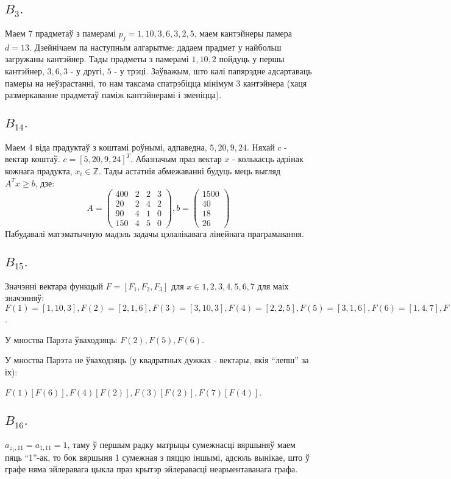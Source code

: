 \documentclass{article}
\begin{document}
\subsection*{$B_{3}.$}
Маем 7 прадметаў з памерамі $p_j = 1, 10, 3, 6, 3, 2, 5$, маем кантэйнеры памера $d = 13$.
Дзейнічаем па наступным алгарытме: дадаем прадмет у найбольш загружаны кантэйнер. Тады прадметы
з памерамі $1, 10, 2$ пойдуць у першы кантэйнер, $3, 6, 3$ - у другі, $5$ - у трэці.
Заўважым, што калі папярэдне адсартаваць памеры на неўзрастанні, то нам таксама спатрэбіцца мінімум
3 кантэйнера (хаця размеркаванне прадметаў паміж кантэйнерамі і зменіцца).

\subsection*{$B_{14}.$}
Маем 4 віда прадуктаў з коштамі роўнымі, адпаведна, $5, 20, 9, 24$. Няхай $c$ - вектар коштаў.
$c = [5, 20, 9, 24]^T$. Абазначым праз вектар $x$ - колькасць адзінак кожнага прадукта, $x_i \in \mathbb{Z}$.
Тады астатнія абмежаванні будуць мець выгляд $A^Tx \geq b$, дзе:
\[
A =
 \begin{pmatrix}
  400 & 2 & 2 & 3 \\
  20 & 2 & 4 & 2 \\
  90 & 4 & 1 & 0 \\
  150 & 4 & 5 & 0
 \end{pmatrix},
b =
 \begin{pmatrix}
  1500 \\
  40 \\
  18 \\
  26
 \end{pmatrix}
\]
Пабудавалі матэматычную мадэль задачы цэлалікавага лінейнага праграмавання.

\subsection*{$B_{15}.$}
Значэнні вектара функцый $F = [F_1, F_2, F_3]$ для $x \in {1, 2, 3, 4, 5, 6, 7}$ для маіх значэнняў:
$F(1) = [1, 10, 3], F(2) = [2, 1, 6], F(3) = [3, 10, 3], F(4) = [2, 2, 5], F(5) = [3, 1, 6], F(6) = [1, 4, 7], F(7) = [3, 3, 3]$.

У мноства Парэта ўваходзяць: $F(2), F(5), F(6)$.

У мноства Парэта не ўваходзяць (у квадратных дужках - вектары, якія ``лепш'' за іх):

$F(1) [F(6)], F(4) [F(2)], F(3) [F(2)], F(7) [F(4)]$.

\subsection*{$B_{16}.$}
$a_{z_1, 11} = a_{1, 11} = 1$, таму ў першым радку матрыцы сумежнасці вяршыняў маем пяць ``1''-ак, то бок
вяршыня 1 сумежная з пяццю іншымі, адсюль вынікае, што ў графе няма эйлеравага цыкла праз крытэр
эйлеравасці неарыентаванага графа.
\end{document}
